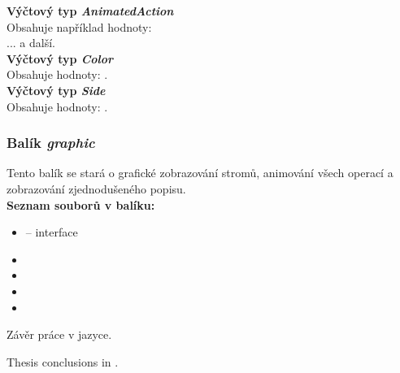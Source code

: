 \documentclass[
  biblatex=false,
  font=serif,
  glossaries=false,
  tables=false,
  theorems=false,
  index
]{kidiplom}
\begin{document}
\noindent \textbf{Výčtový typ \textit{AnimatedAction}}\\
\indent Obsahuje například hodnoty: \\ ... a další.\\

\noindent \textbf{Výčtový typ \textit{Color}}\\
\indent Obsahuje hodnoty: .\\

\noindent \textbf{Výčtový typ \textit{Side}}\\
\indent Obsahuje hodnoty: .\\

\subsubsection{Balík \textit{graphic}}
\indent \indent Tento balík se stará o grafické zobrazování stromů, animování všech operací a zobrazování zjednodušeného popisu.\\ 

\noindent \textbf{Seznam souborů v balíku:}
\begin{itemize}
\item {} -- interface
\item {}
\item {}
\item {}
\item {}
\end{itemize}

\begin{kiconclusions}
Závěr práce v  jazyce.
\end{kiconclusions}

\begin{kiconclusions}[english]
Thesis conclusions in .
\end{kiconclusions}

\appendix
\end{document}
